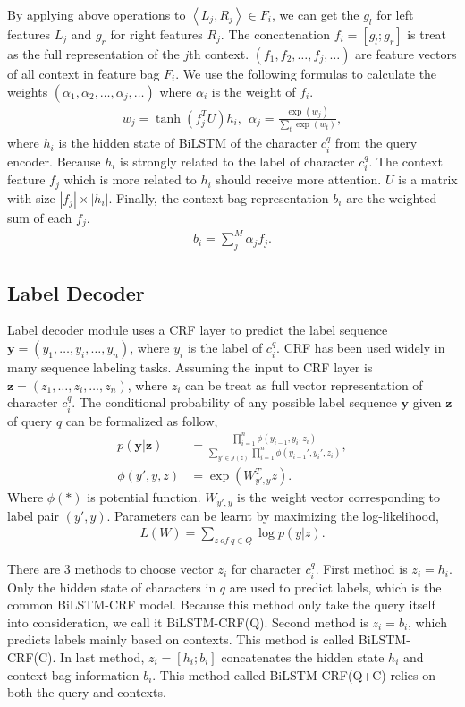 By applying above operations to $\left \langle L_j, R_j \right \rangle \in F_i$, we can get the $g_l$ for left features $L_j$ and $g_r$ for right features $R_j$. The concatenation $f_i = [g_l; g_r]$ is treat as the full representation of the $j$th context.
$(f_1, f_2, \ldots, f_j, \ldots)$ are feature vectors of all context in feature bag $F_i$. We use the following formulas to calculate the weights $(\alpha_1, \alpha_2, \ldots, \alpha_j, \ldots)$ where $\alpha_i$ is the weight of $f_i$.
\begin{align*}
	w_j = \tanh(f_j^TU)h_i, \ \ \alpha_j = \frac{\exp{(w_j)}}{\sum_t \exp{(w_t)}},
\end{align*}
where $h_i$ is the hidden state of BiLSTM of the character $c_i^q$ from the query encoder. Because $h_i$ is strongly related to the label of character $c_i^q$. The context feature $f_j$ which is more related to $h_i$ should receive more attention. $U$ is a matrix with size $|f_j| \times |h_i|$.  Finally, the context bag representation $b_i$ are the weighted sum of each $f_j$.
\begin{align*}
	b_i = \sum_j^M \alpha_j f_j.
\end{align*}

\subsection{Label Decoder}
Label decoder module uses a CRF layer to predict the label sequence $\bm{y} = (y_1,  \ldots, y_i, \ldots, y_n)$, where $y_i$ is the label of $c_i^q$. CRF has been used widely in many sequence labeling tasks. Assuming the input to CRF layer is $\bm{z} = (z_1, \ldots, z_i, \ldots, z_n)$, where $z_i$ can be treat as full vector representation of character $c_i^q$. The conditional probability of any possible label sequence $\bm{y}$ given $\bm{z}$ of query $q$ can be formalized as follow,
\begin{align*}
	p(\bm{y} | \bm{z}) & = \frac{\prod_{i=1}^n \phi(y_{i-1}, y_i, z_i)} {\sum_{y' \in \mathcal{Y}(z)}\prod_{i=1}^n \phi(y_{i-1}', y_i', z_i)}, \\
	\phi(y', y, z)     & = \exp(W_{y', y}^T z).
\end{align*}
Where $\phi(*)$ is potential function. $W_{y', y}$ is the weight vector corresponding to label pair $(y', y)$. Parameters can be learnt by maximizing the log-likelihood,
\begin{align*}
	L(W) = \sum_{z \ of \ q \in Q} \log p(y|z).
\end{align*}

There are 3 methods to choose vector $z_i$ for character $c_i^q$. First method is $z_i = h_i$. Only the hidden state of characters in $q$ are used to predict labels, which is the common BiLSTM-CRF model. Because this method only take the query itself into consideration, we call it BiLSTM-CRF(Q). Second method is $z_i = b_i$, which predicts labels mainly based on contexts. This method is called BiLSTM-CRF(C). In last method, $z_i = [h_i; b_i]$ concatenates the hidden state $h_i$ and context bag information $b_i$. This method called BiLSTM-CRF(Q+C) relies on both the query and contexts.

